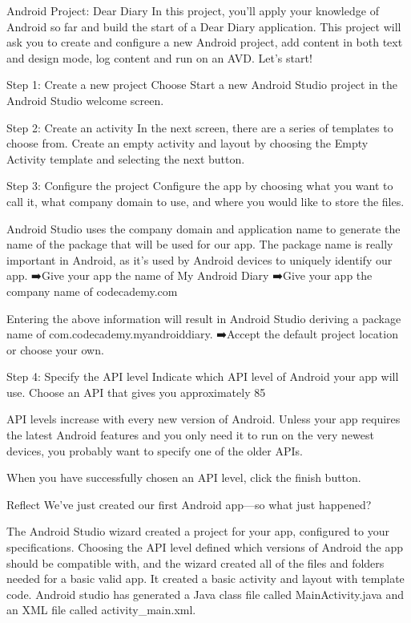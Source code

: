 Android Project: Dear Diary
        In this project, you'll apply your knowledge of Android so far and build the start of a Dear Diary application. This project will ask you to create and configure a new Android project, add content in both text and design mode, log content and run on an AVD. Let's start!
    
    Step 1: Create a new project
        Choose Start a new Android Studio project in the Android Studio welcome screen.

    Step 2: Create an activity
        In the next screen, there are a series of templates to choose from. Create an empty activity and layout by choosing the Empty Activity template and selecting the next button.

    Step 3: Configure the project
        Configure the app by choosing what you want to call it, what company domain to use, and where you would like to store the files.

        Android Studio uses the company domain and application name to generate the name of the package that will be used for our app. The package name is really important in Android, as it’s used by Android devices to uniquely identify our app.   
            ➡️Give your app the name of My Android Diary
            ➡️Give your app the company name of codecademy.com

        Entering the above information will result in Android Studio deriving a package name of com.codecademy.myandroiddiary.
            ➡️Accept the default project location or choose your own.
        
    Step 4: Specify the API level
        Indicate which API level of Android your app will use. Choose an API that gives you approximately 85%

        API levels increase with every new version of Android. Unless your app requires the latest Android features and you only need it to run on the very newest devices, you probably want to specify one of the older APIs.

        When you have successfully chosen an API level, click the finish button.

Reflect
        We’ve just created our first Android app—so what just happened?

        The Android Studio wizard created a project for your app, configured to your specifications. Choosing the API level defined which versions of Android the app should be compatible with, and the wizard created all of the files and folders needed for a basic valid app. It created a basic activity and layout with template code. Android studio has generated a Java class file called MainActivity.java and an XML file called activity_main.xml.

